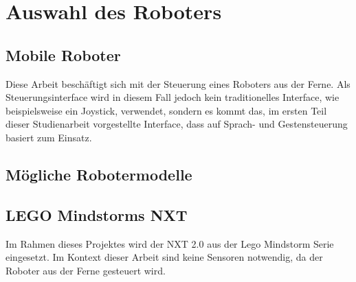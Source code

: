 \chapter{Auswahl des Roboters}
\label{chap:Roboterauswahl}


\section{Mobile Roboter}


Diese Arbeit besch\"aftigt sich mit der Steuerung eines Roboters aus der Ferne. Als Steuerungsinterface wird in diesem Fall jedoch kein traditionelles Interface, wie beispielsweise ein Joystick, verwendet, sondern es kommt das, im ersten Teil dieser Studienarbeit vorgestellte Interface, dass auf Sprach- und Gestensteuerung basiert zum Einsatz. 

\section{M\"ogliche Robotermodelle}

\section{LEGO Mindstorms NXT}

Im Rahmen dieses Projektes wird der NXT 2.0 aus der Lego Mindstorm Serie eingesetzt. Im Kontext dieser Arbeit sind keine Sensoren notwendig, da der Roboter aus der Ferne gesteuert wird. 